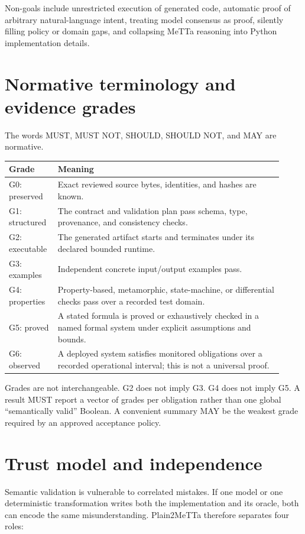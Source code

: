 \documentclass[10pt]{article}
\begin{document}
Non-goals include unrestricted execution of generated code, automatic proof
of arbitrary natural-language intent, treating model consensus as proof,
silently filling policy or domain gaps, and collapsing MeTTa reasoning into
Python implementation details.

\section{Normative terminology and evidence grades}

The words MUST, MUST NOT, SHOULD, SHOULD NOT, and MAY are normative.

\begin{longtable}{p{0.15\linewidth}p{0.77\linewidth}}
\toprule
Grade & Meaning \\
\midrule
G0: preserved & Exact reviewed source bytes, identities, and hashes are known. \\
G1: structured & The contract and validation plan pass schema, type, provenance,
and consistency checks. \\
G2: executable & The generated artifact starts and terminates under its declared
bounded runtime. \\
G3: examples & Independent concrete input/output examples pass. \\
G4: properties & Property-based, metamorphic, state-machine, or differential
checks pass over a recorded test domain. \\
G5: proved & A stated formula is proved or exhaustively checked in a named formal
system under explicit assumptions and bounds. \\
G6: observed & A deployed system satisfies monitored obligations over a recorded
operational interval; this is not a universal proof. \\
\bottomrule
\end{longtable}

Grades are not interchangeable.  G2 does not imply G3.  G4 does not imply G5.
A result MUST report a vector of grades per obligation rather than one global
``semantically valid'' Boolean.  A convenient summary MAY be the weakest grade
required by an approved acceptance policy.

\section{Trust model and independence}

Semantic validation is vulnerable to correlated mistakes.  If one model or
one deterministic transformation writes both the implementation and its
oracle, both can encode the same misunderstanding.  Plain2MeTTa therefore
separates four roles:
\end{document}
